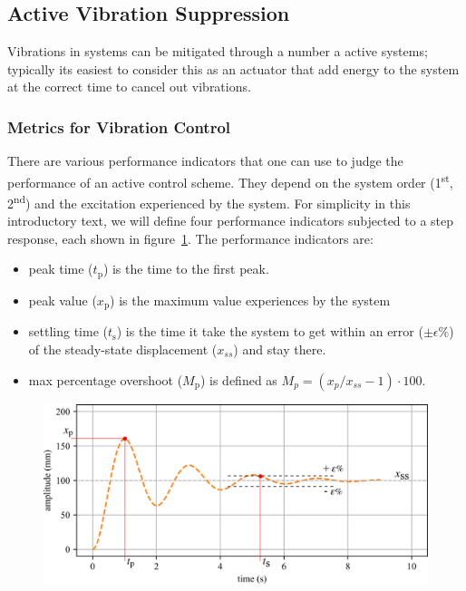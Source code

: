 \documentclass[12pt,letter]{article}
\numberwithin{ex}{section} %
\numberwithin{re}{section} %
\numberwithin{vcs}{section} %
\begin{document}
\subsection{Active Vibration Suppression}

Vibrations in systems can be mitigated through a number a active systems; typically its easiest to consider this as an actuator that add energy to the system at the correct time to cancel out vibrations. 

\subsubsection{Metrics for Vibration Control}

There are various performance indicators that one can use to judge the performance of an active control scheme. They depend on the system order (1\textsuperscript{st}, 2\textsuperscript{nd}) and the excitation experienced by the system. For simplicity in this introductory text, we will define four performance indicators subjected to a step response, each shown in figure~\ref{fig:2nd_order_performance_indicators}. The performance indicators are:
\begin{itemize}[itemsep=0.25ex,topsep=0.25ex]
	\item peak time  ($t_\text{p}$) is the time to the first peak.
	\item peak value  ($x_\text{p}$) is the maximum value experiences by the system
	\item settling time ($t_\text{s}$) is the time it take the system to get within an error ($\pm \epsilon \%$) of the steady-state displacement ($x_{ss}$) and stay there.
	\item max percentage overshoot ($M_\text{p}$) is defined as $M_p = ( {x_p} / {x_{ss}}-1 ) \cdot 100$.
\end{itemize}

\begin{figure}[H]
	\centering
	\includegraphics[]{../figures/2nd_order_performance_indicators}
	\label{fig:2nd_order_performance_indicators}
\end{figure}
\end{document}
